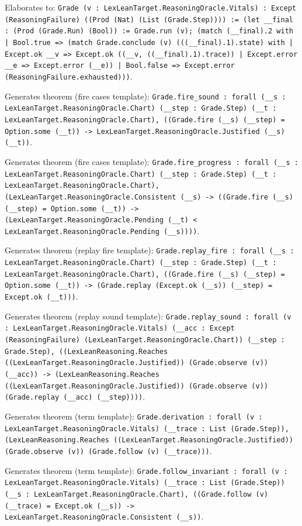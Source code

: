 \documentclass[11pt]{article}
\begin{document}
\noindent Elaborates to: \texttt{Grade (v : LexLeanTarget.ReasoningOracle.Vitals) : Except (ReasoningFailure) ((Prod (Nat) (List (Grade.Step)))) := (let \_\_final : (Prod (Grade.Run) (Bool)) := Grade.run (v); (match (\_\_final).2 with | Bool.true => (match Grade.conclude (v) (((\_\_final).1).state) with | Except.ok \_\_v => Except.ok ((\_\_v, ((\_\_final).1).trace)) | Except.error \_\_e => Except.error (\_\_e)) | Bool.false => Except.error (ReasoningFailure.exhausted)))}.\par
\noindent Generates theorem (fire cases template): \texttt{Grade.fire\_sound : forall (\_\_s : LexLeanTarget.ReasoningOracle.Chart) (\_\_step : Grade.Step) (\_\_t : LexLeanTarget.ReasoningOracle.Chart), ((Grade.fire (\_\_s) (\_\_step) = Option.some (\_\_t)) -> LexLeanTarget.ReasoningOracle.Justified (\_\_s) (\_\_t))}.\par
\noindent Generates theorem (fire cases template): \texttt{Grade.fire\_progress : forall (\_\_s : LexLeanTarget.ReasoningOracle.Chart) (\_\_step : Grade.Step) (\_\_t : LexLeanTarget.ReasoningOracle.Chart), (LexLeanTarget.ReasoningOracle.Consistent (\_\_s) -> ((Grade.fire (\_\_s) (\_\_step) = Option.some (\_\_t)) -> (LexLeanTarget.ReasoningOracle.Pending (\_\_t) < LexLeanTarget.ReasoningOracle.Pending (\_\_s))))}.\par
\noindent Generates theorem (replay fire template): \texttt{Grade.replay\_fire : forall (\_\_s : LexLeanTarget.ReasoningOracle.Chart) (\_\_step : Grade.Step) (\_\_t : LexLeanTarget.ReasoningOracle.Chart), ((Grade.fire (\_\_s) (\_\_step) = Option.some (\_\_t)) -> (Grade.replay (Except.ok (\_\_s)) (\_\_step) = Except.ok (\_\_t)))}.\par
\noindent Generates theorem (replay sound template): \texttt{Grade.replay\_sound : forall (v : LexLeanTarget.ReasoningOracle.Vitals) (\_\_acc : Except (ReasoningFailure) (LexLeanTarget.ReasoningOracle.Chart)) (\_\_step : Grade.Step), ((LexLeanReasoning.Reaches ((LexLeanTarget.ReasoningOracle.Justified)) (Grade.observe (v)) (\_\_acc)) -> (LexLeanReasoning.Reaches ((LexLeanTarget.ReasoningOracle.Justified)) (Grade.observe (v)) (Grade.replay (\_\_acc) (\_\_step))))}.\par
\noindent Generates theorem (term template): \texttt{Grade.derivation : forall (v : LexLeanTarget.ReasoningOracle.Vitals) (\_\_trace : List (Grade.Step)), (LexLeanReasoning.Reaches ((LexLeanTarget.ReasoningOracle.Justified)) (Grade.observe (v)) (Grade.follow (v) (\_\_trace)))}.\par
\noindent Generates theorem (term template): \texttt{Grade.follow\_invariant : forall (v : LexLeanTarget.ReasoningOracle.Vitals) (\_\_trace : List (Grade.Step)) (\_\_s : LexLeanTarget.ReasoningOracle.Chart), ((Grade.follow (v) (\_\_trace) = Except.ok (\_\_s)) -> LexLeanTarget.ReasoningOracle.Consistent (\_\_s))}.\par
\end{document}

